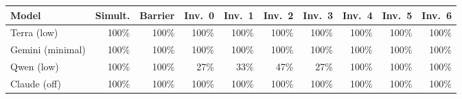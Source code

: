 \begin{adjustbox}{max width=\linewidth}
\begin{tabular}{@{}lrrrrrrrrr@{}}
\toprule
Model & Simult. & Barrier & Inv.\ 0 & Inv.\ 1 & Inv.\ 2 & Inv.\ 3 & Inv.\ 4 & Inv.\ 5 & Inv.\ 6 \\
\midrule
Terra (low) & 100\% & 100\% & 100\% & 100\% & 100\% & 100\% & 100\% & 100\% & 100\% \\
Gemini (minimal) & 100\% & 100\% & 100\% & 100\% & 100\% & 100\% & 100\% & 100\% & 100\% \\
Qwen (low) & 100\% & 100\% & 27\% & 33\% & 47\% & 27\% & 100\% & 100\% & 100\% \\
Claude (off) & 100\% & 100\% & 100\% & 100\% & 100\% & 100\% & 100\% & 100\% & 100\% \\
\bottomrule
\end{tabular}
\end{adjustbox}

\par{}
